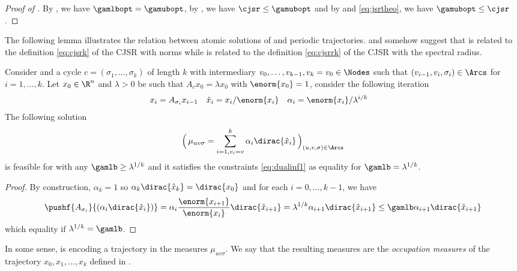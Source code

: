 \documentclass[11pt,twoside,a4paper,openright]{uclouvain-thesis}
\begin{document}
\begin{proof}[Proof of ]
    By , we have $\gamlbopt = \gamubopt$, by , we have $\cjsr \leq \gamubopt$ and by  and \eqref{eq:jsrtheo}, we have $\gamubopt \leq \cjsr$.
\end{proof}


The following lemma illustrates the relation between atomic solutions of  and periodic trajectories.
 and  somehow suggest that  is related to the definition \eqref{eq:cjsrk} of the CJSR with norms while  is related to the definition \eqref{eq:cjsrrk} of the CJSR with the spectral radius.

\begin{mylem}
    \label{lem:traj2meas}
    Consider 
    and a cycle $c = (\sigma_1, \ldots, \sigma_k)$ of length $k$ with intermediary \nodes{} $v_0, \ldots, v_{k-1},v_k=v_0 \in \Nodes$ such that $(v_{i-1}, v_i, \sigma_i) \in \Arcs$ for $i = 1, \ldots, k$.
    Let $x_0 \in \R^n$ and $\lambda > 0$ be such that $A_c x_0 = \lambda x_0$ with $\enorm{x_0} = 1$,
    consider the following iteration
    \begin{align*}
      x_i & = A_{\sigma_i} x_{i-1} &
      \hat{x}_i & = x_i/\enorm{x_i} &
      \alpha_i & = \enorm{x_i}/\lambda^{i/k}
    \end{align*}
    The following solution
    \[ \Big(\,\mu_{uv\sigma} = \sum_{i=1,v_i = v}^k \alpha_i \dirac{\hat{x}_i} \,\Big)_{(u,v,\sigma) \in \Arcs} \]
    is feasible for  with any $\gamlb \geq \lambda^{1/k}$
    and it satisfies the constraints \eqref{eq:dualinf1} as equality for $\gamlb = \lambda^{1/k}$.
    \begin{proof}
        By construction, $\alpha_k = 1$ so $\alpha_k\dirac{\hat{x}_k} = \dirac{x_0}$ and
        for each $i = 0, \ldots, k-1$, we have
        \[
            \pushf{A_{\sigma_i}}{(\alpha_i \dirac{\hat{x}_i})}
            = \alpha_i \frac{\enorm{x_{i+1}}}{\enorm{x_i}} \dirac{\hat{x}_{i+1}}
            = \lambda^{1/k} \alpha_{i+1} \dirac{\hat{x}_{i+1}}
            \leq \gamlb \alpha_{i+1} \dirac{\hat{x}_{i+1}}
        \]
        which equality if $\lambda^{1/k} = \gamlb$.
    \end{proof}
\end{mylem}


In some sense,  is encoding a trajectory in the measures $\mu_{uv\sigma}$.
We say that the resulting measures are the \emph{occupation measures} of the trajectory $x_0, x_1, \ldots, x_k$ defined in .
\end{document}
